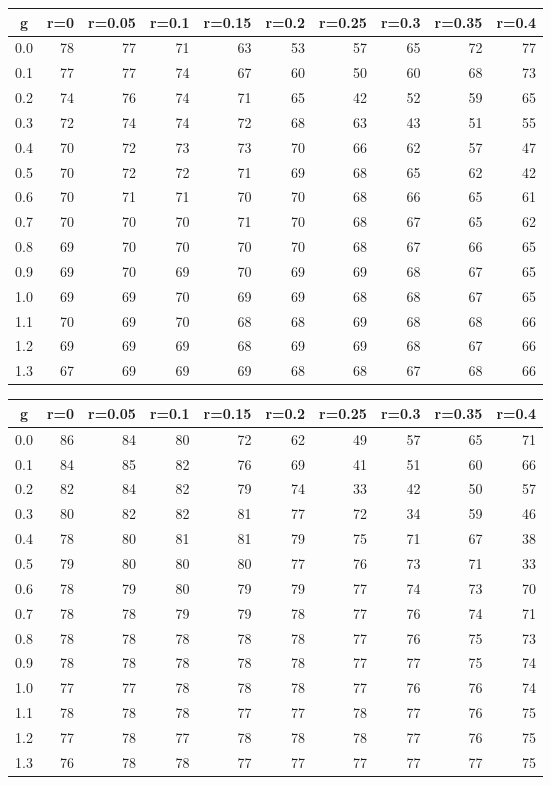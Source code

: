 %
\begin{table}[!tbp]
 \begin{center}
 \begin{tabular}{rrrrrrrrrr}\hline\hline
\multicolumn{1}{c}{g}&\multicolumn{1}{c}{r=0}&\multicolumn{1}{c}{r=0.05}&\multicolumn{1}{c}{r=0.1}&\multicolumn{1}{c}{r=0.15}&\multicolumn{1}{c}{r=0.2}&\multicolumn{1}{c}{r=0.25}&\multicolumn{1}{c}{r=0.3}&\multicolumn{1}{c}{r=0.35}&\multicolumn{1}{c}{r=0.4}\tabularnewline
\hline
0.0&78&77&71&63&53&57&65&72&77\tabularnewline
0.1&77&77&74&67&60&50&60&68&73\tabularnewline
0.2&74&76&74&71&65&42&52&59&65\tabularnewline
0.3&72&74&74&72&68&63&43&51&55\tabularnewline
0.4&70&72&73&73&70&66&62&57&47\tabularnewline
0.5&70&72&72&71&69&68&65&62&42\tabularnewline
0.6&70&71&71&70&70&68&66&65&61\tabularnewline
0.7&70&70&70&71&70&68&67&65&62\tabularnewline
0.8&69&70&70&70&70&68&67&66&65\tabularnewline
0.9&69&70&69&70&69&69&68&67&65\tabularnewline
1.0&69&69&70&69&69&68&68&67&65\tabularnewline
1.1&70&69&70&68&68&69&68&68&66\tabularnewline
1.2&69&69&69&68&69&69&68&67&66\tabularnewline
1.3&67&69&69&69&68&68&67&68&66\tabularnewline
\hline
\end{tabular}

\end{center}

\end{table}

%
\begin{table}[!tbp]
 \begin{center}
 \begin{tabular}{rrrrrrrrrr}\hline\hline
\multicolumn{1}{c}{g}&\multicolumn{1}{c}{r=0}&\multicolumn{1}{c}{r=0.05}&\multicolumn{1}{c}{r=0.1}&\multicolumn{1}{c}{r=0.15}&\multicolumn{1}{c}{r=0.2}&\multicolumn{1}{c}{r=0.25}&\multicolumn{1}{c}{r=0.3}&\multicolumn{1}{c}{r=0.35}&\multicolumn{1}{c}{r=0.4}\tabularnewline
\hline
0.0&86&84&80&72&62&49&57&65&71\tabularnewline
0.1&84&85&82&76&69&41&51&60&66\tabularnewline
0.2&82&84&82&79&74&33&42&50&57\tabularnewline
0.3&80&82&82&81&77&72&34&59&46\tabularnewline
0.4&78&80&81&81&79&75&71&67&38\tabularnewline
0.5&79&80&80&80&77&76&73&71&33\tabularnewline
0.6&78&79&80&79&79&77&74&73&70\tabularnewline
0.7&78&78&79&79&78&77&76&74&71\tabularnewline
0.8&78&78&78&78&78&77&76&75&73\tabularnewline
0.9&78&78&78&78&78&77&77&75&74\tabularnewline
1.0&77&77&78&78&78&77&76&76&74\tabularnewline
1.1&78&78&78&77&77&78&77&76&75\tabularnewline
1.2&77&78&77&78&78&78&77&76&75\tabularnewline
1.3&76&78&78&77&77&77&77&77&75\tabularnewline
\hline
\end{tabular}

\end{center}

\end{table}

